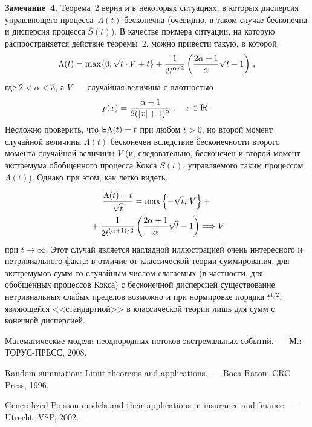 \begin{multicols}{2}
{}

\medskip

\noindent
\textbf{Замечание~4.} Теорема~2 верна и в некоторых ситуациях, в
которых дисперсия управляющего процесса~$\Lambda(t)$ бесконечна
(очевидно, в таком случае бесконечна и дисперсия процесса
$\overline S(t)$). В качестве примера ситуации, на которую
распространяется действие теоремы~2, можно привести такую, в
которой
$$
\Lambda(t)=\max\{0,\sqrt{t}\cdot V+t\}+\displaystyle\frac{\displaystyle 1\mathstrut}{\displaystyle 2t^{\alpha/2}\mathstrut}\left(\displaystyle\frac{\displaystyle 2\alpha+1\mathstrut}{\displaystyle \alpha\mathstrut}\sqrt{t}-1\right )\,,
$$
где $2<\alpha<3$, а $V$~--- случайная величина с плот\-ностью
$$
p(x)=\displaystyle\frac{\displaystyle \alpha+1\mathstrut}{\displaystyle 2(|x|+1)^{\alpha}\mathstrut}\,,\quad x\in{\rm I\hspace{-0.7mm}\rm R}\,.
$$
Несложно проверить, что ${\sf E}\Lambda(t)=t$ при любом $t>0$, но
второй момент случайной величины $\Lambda(t)$ бесконечен
вследствие бесконечности второго момента случайной величины $V$
(и, следовательно, бесконечен и второй момент экстремума
обобщенного процесса Кокса $S(t)$, управляемого таким процессом
$\Lambda(t)$). Однако при этом, как легко видеть,
{

}

\noindent
\begin{multline*}
\displaystyle\frac{\displaystyle \Lambda(t)-t\mathstrut}{\displaystyle \sqrt{t}\mathstrut}=
\max\left \{-\sqrt{t},\,V\right \}+{}\\
{}+
\displaystyle\frac{\displaystyle 1\mathstrut}{\displaystyle 2t^{(\alpha+1)/2}\mathstrut}\left (\displaystyle\frac{\displaystyle 2\alpha+1\mathstrut}{\displaystyle \alpha\mathstrut}\sqrt{t}-1\right)
\Longrightarrow V
\end{multline*}
при $t\to\infty$. Этот случай является наглядной иллюстрацией
очень интересного и нетривиального факта: в отличие от
классической теории суммирования, для экстремумов сумм со
случайным числом слагаемых (в частности, для обобщенных процессов
Кокса) с бесконечной дисперсией существование нетривиальных слабых
пределов возможно и при нормировке порядка $t^{1/2}$, являющейся
<<стандартной>> в классической теории лишь для сумм с конечной
дисперсией.


{\small\frenchspacing
{%
\begin{thebibliography}{9}
Математические модели
неоднородных потоков экстремальных событий.~--- М.: ТОРУС-ПРЕСС, 2008. %

Random summation: Limit theorems
and applications.~--- Boca Raton: CRC Press, 1996. %

Generalized Poisson models and
their applications in insurance and finance.~--- Utrecht: VSP, 2002. %


\end{thebibliography}}}
\end{multicols}
